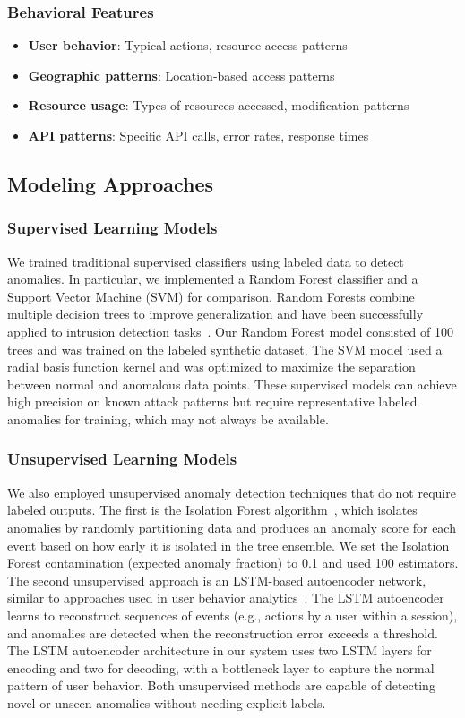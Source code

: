 \documentclass[conference]{IEEEtran}
\begin{document}
\subsubsection{Behavioral Features}
\begin{itemize}
    \item \textbf{User behavior}: Typical actions, resource access patterns
    \item \textbf{Geographic patterns}: Location-based access patterns
    \item \textbf{Resource usage}: Types of resources accessed, modification patterns
    \item \textbf{API patterns}: Specific API calls, error rates, response times
\end{itemize}

\subsection{Modeling Approaches}
\subsubsection{Supervised Learning Models}
We trained traditional supervised classifiers using labeled data to detect anomalies. In particular, we implemented a Random Forest classifier and a Support Vector Machine (SVM) for comparison. Random Forests combine multiple decision trees to improve generalization and have been successfully applied to intrusion detection tasks~\cite{ref7}. Our Random Forest model consisted of 100 trees and was trained on the labeled synthetic dataset. The SVM model used a radial basis function kernel and was optimized to maximize the separation between normal and anomalous data points. These supervised models can achieve high precision on known attack patterns but require representative labeled anomalies for training, which may not always be available.

\subsubsection{Unsupervised Learning Models}
We also employed unsupervised anomaly detection techniques that do not require labeled outputs. The first is the Isolation Forest algorithm~\cite{ref2}, which isolates anomalies by randomly partitioning data and produces an anomaly score for each event based on how early it is isolated in the tree ensemble. We set the Isolation Forest contamination (expected anomaly fraction) to 0.1 and used 100 estimators. The second unsupervised approach is an LSTM-based autoencoder network, similar to approaches used in user behavior analytics~\cite{ref12}. The LSTM autoencoder learns to reconstruct sequences of events (e.g., actions by a user within a session), and anomalies are detected when the reconstruction error exceeds a threshold. The LSTM autoencoder architecture in our system uses two LSTM layers for encoding and two for decoding, with a bottleneck layer to capture the normal pattern of user behavior. Both unsupervised methods are capable of detecting novel or unseen anomalies without needing explicit labels.
\end{document}
